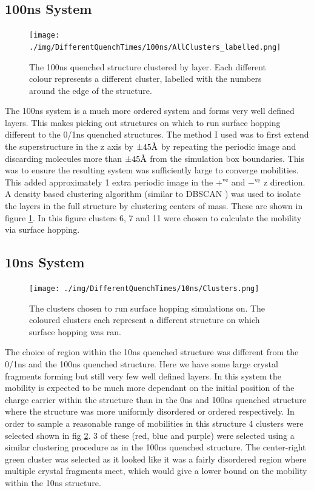 \subsection{100ns System}
\begin{figure}[h]
	\centering
	\texttt{[image: ./img/DifferentQuenchTimes/100ns/AllClusters\_labelled.png]}
	\caption{\label{fig:100nsClusteredLabelled}The 100ns quenched structure clustered by layer. Each different colour represents a different cluster, labelled with the numbers around the edge of the structure.}
\end{figure}
The 100ns system is a much more ordered system and forms very well defined layers. This makes picking out structures on which to run surface hopping different to the 0/1ns quenched structures. The method I used was to first extend the superstructure in the z axis by $\pm45 \text{\normalfont\AA}$ by repeating the periodic image and discarding molecules more than $\pm45 \text{\normalfont\AA}$ from the simulation box boundaries. This was to ensure the resulting system was sufficiently large to converge mobilities. This added approximately 1 extra periodic image in the $+^{\text{ve}}$ and $-^{\text{ve}}$ z direction. A density based clustering algorithm (similar to DBSCAN \cite{DBSCAN}) was used to isolate the layers in the full structure by clustering centers of mass. These are shown in figure \ref{fig:100nsClusteredLabelled}. In this figure clusters 6, 7 and 11 were chosen to calculate the mobility via surface hopping.
\clearpage

\subsection{10ns System}
\begin{figure}
	\texttt{[image: ./img/DifferentQuenchTimes/10ns/Clusters.png]}
	\caption{\label{fig:10nsClusters}The clusters chosen to run surface hopping simulations on. The coloured clusters each represent a different structure on which surface hopping was ran.}
\end{figure}
The choice of region within the 10ns quenched structure was different from the 0/1ns and the 100ns quenched structure. Here we have some large crystal fragments forming but still very few well defined layers. In this system the mobility is expected to be much more dependant on the initial position of the charge carrier within the structure than in the 0ns and 100ns quenched structure where the structure was more uniformly disordered or ordered respectively. In order to sample a reasonable range of mobilities in this structure 4 clusters were selected shown in fig \ref{fig:10nsClusters}. 3 of these (red, blue and purple) were selected using a similar clustering procedure as in the 100ns quenched structure. The center-right green cluster was selected as it looked like it was a fairly disordered region where multiple crystal fragments meet, which would give a lower bound on the mobility within the 10ns structure.


